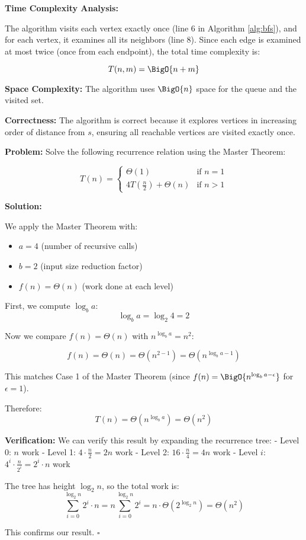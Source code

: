 \textbf{Time Complexity Analysis:}

The algorithm visits each vertex exactly once (line 6 in Algorithm \ref{alg:bfs}), and for each vertex, it examines all its neighbors (line 8). Since each edge is examined at most twice (once from each endpoint), the total time complexity is:

\[
    T(n,m) = \BigO{n + m}
\]

\textbf{Space Complexity:} The algorithm uses $\BigO{n}$ space for the queue and the visited set.

\textbf{Correctness:} The algorithm is correct because it explores vertices in increasing order of distance from $s$, ensuring all reachable vertices are visited exactly once.



\textbf{Problem:} Solve the following recurrence relation using the Master Theorem:

\[
    T(n) = \begin{cases}
        \Theta(1) & \text{if } n = 1\\
        4T\left(\frac{n}{2}\right) + \Theta(n) & \text{if } n > 1
    \end{cases}
\]

\textbf{Solution:}

We apply the Master Theorem with:
\begin{itemize}
    \item $a = 4$ (number of recursive calls)
    \item $b = 2$ (input size reduction factor)
    \item $f(n) = \Theta(n)$ (work done at each level)
\end{itemize}

First, we compute $\log_b a$:
\[
    \log_b a = \log_2 4 = 2
\]

Now we compare $f(n) = \Theta(n)$ with $n^{\log_b a} = n^2$:

\[
    f(n) = \Theta(n) = \Theta(n^{2-1}) = \Theta(n^{\log_b a - 1})
\]

This matches Case 1 of the Master Theorem (since $f(n) = \BigO{n^{\log_b a - \epsilon}}$ for $\epsilon = 1$).

Therefore:
\[
    T(n) = \Theta(n^{\log_b a}) = \Theta(n^2)
\]

\textbf{Verification:} We can verify this result by expanding the recurrence tree:
- Level 0: $n$ work
- Level 1: $4 \cdot \frac{n}{2} = 2n$ work
- Level 2: $16 \cdot \frac{n}{4} = 4n$ work
- Level $i$: $4^i \cdot \frac{n}{2^i} = 2^i \cdot n$ work

The tree has height $\log_2 n$, so the total work is:
\[
    \sum_{i=0}^{\log_2 n} 2^i \cdot n = n \sum_{i=0}^{\log_2 n} 2^i = n \cdot \Theta(2^{\log_2 n}) = \Theta(n^2)
\]

This confirms our result. \hfill$\square$
